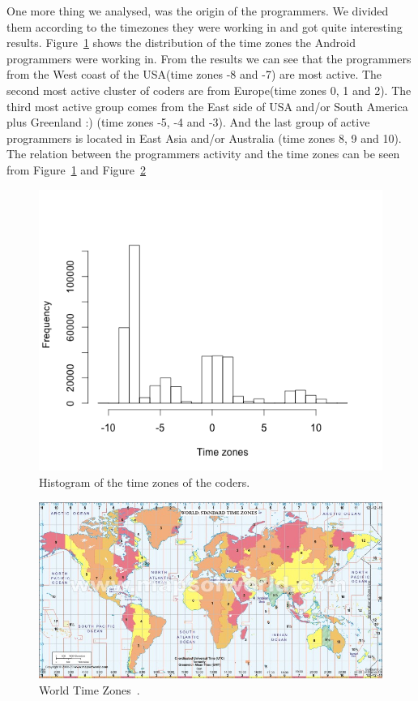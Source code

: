 \documentclass[a4paper,11pt]{article}
\begin{document}
One more thing we analysed, was the origin of the programmers. We divided them according to the timezones they were working in and got quite interesting results. Figure~\ref{fig:time_zones} shows the distribution of the time zones the Android programmers were working in. From the results we can see that the programmers from the West coast of the USA(time zones -8 and -7) are most active. The second most active cluster of coders are from Europe(time zones 0, 1 and 2). The third most active group comes from the East side of USA and/or South America plus Greenland :) (time zones -5, -4 and -3). And the last group of active programmers is located in East Asia and/or Australia (time zones 8, 9 and 10). The relation between the programmers activity and the time zones can be seen from Figure~\ref{fig:time_zones} and Figure~\ref{fig:tz_map}

\begin{figure}[ht!]
\centering
\includegraphics[width=.7\textwidth]{../diagrams/time_zones.png}
\caption{Histogram of the time zones of the coders.}
\label{fig:time_zones}
\end{figure}

\begin{figure}[ht!]
\centering
\includegraphics[width=1.2\textwidth]{../diagrams/World-Time-Zone.jpg}
\caption{World Time Zones~\cite{map}.}
\label{fig:tz_map}
\end{figure}
\end{document}
